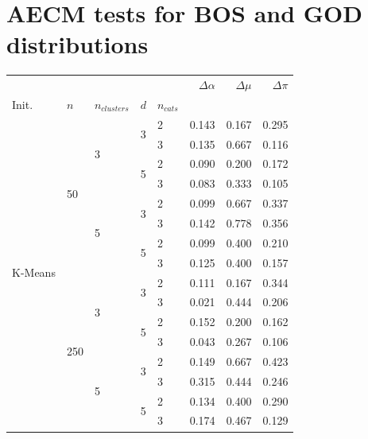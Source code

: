 \appendix

\section{AECM tests for BOS and GOD distributions}
\label{appendix:metrics_synth}

\begin{table}[H]
\centering
\begin{minipage}{.48\columnwidth}
\centering
\begin{adjustbox}{width=\columnwidth}
\begin{tabular}{lllllrrr}
\toprule
 &  &  &  &  & $\Delta \alpha$ & $\Delta \mu$ & $\Delta \pi$ \\
Init. & $n$ & $n_{clusters}$ & $d$ & $n_{cats}$ &  &  &  \\
\midrule
\multirow[t]{16}{*}{K-Means} & \multirow[t]{8}{*}{50} & \multirow[t]{4}{*}{3} & \multirow[t]{2}{*}{3} & 2 & 0.143 & 0.167 & 0.295 \\
 &  &  &  & 3 & 0.135 & 0.667 & 0.116 \\
\cline{4-8}
 &  &  & \multirow[t]{2}{*}{5} & 2 & 0.090 & 0.200 & 0.172 \\
 &  &  &  & 3 & 0.083 & 0.333 & 0.105 \\
\cline{3-8} \cline{4-8}
 &  & \multirow[t]{4}{*}{5} & \multirow[t]{2}{*}{3} & 2 & 0.099 & 0.667 & 0.337 \\
 &  &  &  & 3 & 0.142 & 0.778 & 0.356 \\
\cline{4-8}
 &  &  & \multirow[t]{2}{*}{5} & 2 & 0.099 & 0.400 & 0.210 \\
 &  &  &  & 3 & 0.125 & 0.400 & 0.157 \\
\cline{2-8} \cline{3-8} \cline{4-8}
 & \multirow[t]{8}{*}{250} & \multirow[t]{4}{*}{3} & \multirow[t]{2}{*}{3} & 2 & 0.111 & 0.167 & 0.344 \\
 &  &  &  & 3 & 0.021 & 0.444 & 0.206 \\
\cline{4-8}
 &  &  & \multirow[t]{2}{*}{5} & 2 & 0.152 & 0.200 & 0.162 \\
 &  &  &  & 3 & 0.043 & 0.267 & 0.106 \\
\cline{3-8} \cline{4-8}
 &  & \multirow[t]{4}{*}{5} & \multirow[t]{2}{*}{3} & 2 & 0.149 & 0.667 & 0.423 \\
 &  &  &  & 3 & 0.315 & 0.444 & 0.246 \\
\cline{4-8}
 &  &  & \multirow[t]{2}{*}{5} & 2 & 0.134 & 0.400 & 0.290 \\
 &  &  &  & 3 & 0.174 & 0.467 & 0.129 \\

\end{tabular}
\end{adjustbox}
\end{minipage}
\end{table}
